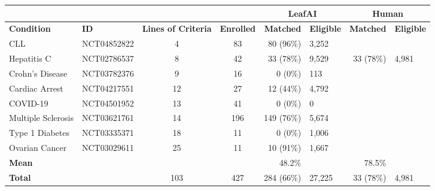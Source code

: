 \def\arraystretch{1.4}
\begin{tabular}{l l c c |r l |r l}
     & & & & \multicolumn{2}{c}{\textbf{LeafAI}} & \multicolumn{2}{|c}{\textbf{Human}}  \\
     \toprule
    \textbf{Condition} & \textbf{ID} & \textbf{Lines of Criteria} & \textbf{Enrolled} & \textbf{Matched} & \textbf{Eligible} & \textbf{Matched} & \textbf{Eligible} \\
    \midrule
    CLL                & \footnotesize{NCT04852822} & 4 & 83 & 80 (96\%) & 3,252 \\
    Hepatitis C        & \footnotesize{NCT02786537} & 8 & 42 & 33 (78\%) & 9,529 & 33 (78\%) & 4,981 \\
    Crohn's Disease    & \footnotesize{NCT03782376} & 9 & 16 & 0 (0\%) & 113 \\
    Cardiac Arrest     & \footnotesize{NCT04217551} & 12 & 27 & 12 (44\%) & 4,792 \\
    COVID-19           & \footnotesize{NCT04501952} & 13 & 41 & 0 (0\%) & 0 \\
    Multiple Sclerosis & \footnotesize{NCT03621761} & 14 & 196 & 149 (76\%) & 5,674 \\
    Type 1 Diabetes    & \footnotesize{NCT03335371} & 18 & 11  & 0 (0\%)      & 1,006 \\
    Ovarian Cancer     & \footnotesize{NCT03029611} & 25 & 11 & 10 (91\%) & 1,667 \\
    \bottomrule
    \textbf{Mean} & & & & 48.2\% & & 78.5\% \\
    \textbf{Total} & & 103 & 427 & 284 (66\%) & 27,225 & 33 (78\%) & 4,981 \\
\end{tabular}